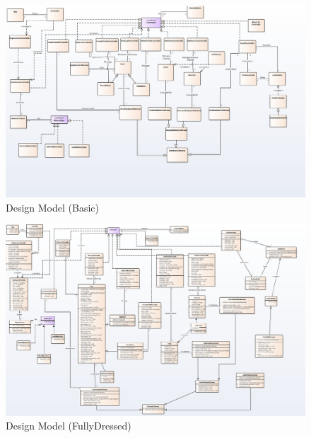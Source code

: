 \documentclass[10pt]{article}
\begin{document}
\begin{figure}[h!]
	\begin{center}
		\includegraphics[width=\columnwidth]{DesignBasic.png}
		\caption{{Design Model (Basic)
				{\label{div-291050}}%
		}}
	\end{center}
\end{figure}


\begin{figure}[h!]
	\begin{center}
		\includegraphics[width=\columnwidth]{DesignFull.png}
		\caption{{Design Model (FullyDressed)
				{\label{div-291050}}%
		}}
	\end{center}
\end{figure}
\clearpage
\end{document}
